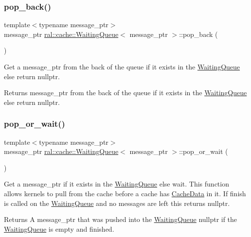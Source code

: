 \subsubsection{\texorpdfstring{pop\+\_\+back()}{pop\_back()}}
{\footnotesize\ttfamily template$<$typename message\+\_\+ptr$>$ \\
message\+\_\+ptr \hyperlink{classral_1_1cache_1_1WaitingQueue}{ral\+::cache\+::\+Waiting\+Queue}$<$ message\+\_\+ptr $>$\+::pop\+\_\+back (\begin{DoxyParamCaption}{ }\end{DoxyParamCaption})\hspace{0.3cm}{\ttfamily [inline]}}

Get a message\+\_\+ptr from the back of the queue if it exists in the \hyperlink{classral_1_1cache_1_1WaitingQueue}{Waiting\+Queue} else return nullptr. \begin{DoxyReturn}{Returns}
message\+\_\+ptr from the back of the queue if it exists in the \hyperlink{classral_1_1cache_1_1WaitingQueue}{Waiting\+Queue} else return nullptr. 
\end{DoxyReturn}
\mbox{\label{classral_1_1cache_1_1WaitingQueue_afbc5898a999bb8b5257c5de1b656db1c}} 
\subsubsection{\texorpdfstring{pop\+\_\+or\+\_\+wait()}{pop\_or\_wait()}}
{\footnotesize\ttfamily template$<$typename message\+\_\+ptr$>$ \\
message\+\_\+ptr \hyperlink{classral_1_1cache_1_1WaitingQueue}{ral\+::cache\+::\+Waiting\+Queue}$<$ message\+\_\+ptr $>$\+::pop\+\_\+or\+\_\+wait (\begin{DoxyParamCaption}{ }\end{DoxyParamCaption})\hspace{0.3cm}{\ttfamily [inline]}}

Get a message\+\_\+ptr if it exists in the \hyperlink{classral_1_1cache_1_1WaitingQueue}{Waiting\+Queue} else wait. This function allows kernels to pull from the cache before a cache has \hyperlink{classral_1_1cache_1_1CacheData}{Cache\+Data} in it. If finish is called on the \hyperlink{classral_1_1cache_1_1WaitingQueue}{Waiting\+Queue} and no messages are left this returns nullptr. \begin{DoxyReturn}{Returns}
A message\+\_\+ptr that was pushed into the \hyperlink{classral_1_1cache_1_1WaitingQueue}{Waiting\+Queue} nullptr if the \hyperlink{classral_1_1cache_1_1WaitingQueue}{Waiting\+Queue} is empty and finished. 
\end{DoxyReturn}
\mbox{\label{classral_1_1cache_1_1WaitingQueue_a0ba9790cb2d41d01f7721b9972e4ff44}} 
